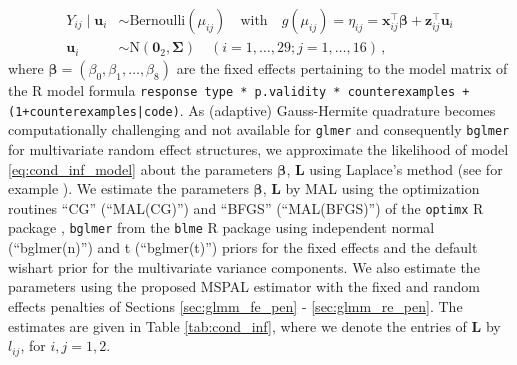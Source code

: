 \documentclass[11pt, a4paper]{article}
\newcommand*{\bb}{\boldsymbol}
\theoremstyle{example} \newtheorem{example}{Example}[section]
\theoremstyle{theorem} \newtheorem{theorem}{Theorem}[section]
\def\bbeta{\bb{\beta}}
\def\bu{\bb{u}}
\def\bx{\bb{x}}
\def\bz{\bb{z}}
\def\b0{\bb{0}}
\def\bL{\bb{L}}
\begin{document}
\begin{align}
\label{eq:cond_inf_model} 
  Y_{ij} \mid \bb{u}_i & \sim \text{Bernoulli}(\mu_{ij}) \quad \text{with} \quad
g(\mu_{ij}) = \eta_{ij} = \bx_{ij}^\top \bbeta + \bz_{ij}^\top \bu_i\\
\bu_i & \sim \text{N}(\b0_2, \bb{\Sigma})  \quad (i = 1, \ldots, 29; j = 1, \ldots, 16)\,,
\end{align}
where $\bbeta = (\beta_0,\beta_1,\ldots,\beta_8)$ are the fixed effects pertaining to the model matrix of the R model formula \texttt{response \raisebox{-0.9ex}{\~{}} type * p.validity * counterexamples + (1+counterexamples|code)}. As (adaptive) Gauss-Hermite quadrature becomes computationally challenging and not available for \texttt{glmer} and consequently \texttt{bglmer} for multivariate random effect structures, we approximate the likelihood of model \eqref{eq:cond_inf_model} about the parameters $\bbeta$, $\bL$ using Laplace's method (see for example \cite{pinheiro1995approximations}). We estimate the parameters $\bbeta$, $\bL$ by MAL using the optimization routines ``CG'' (``MAL(CG)'') and ``BFGS'' (``MAL(BFGS)'') of the \texttt{optimx} R package \citep{nash+varadhan:2011}, \texttt{bglmer} from the \texttt{blme} R package \cite{chung+etal:2015} using independent normal (``bglmer(n)'') and t (``bglmer(t)'') priors for the fixed effects and the default wishart prior for the multivariate variance components. We also estimate the parameters using the proposed MSPAL estimator with the fixed and random effects penalties of Sections \ref{sec:glmm_fe_pen} - \ref{sec:glmm_re_pen}. The estimates are given in Table \ref{tab:cond_inf}, where we denote the entries of $\bL$ by $l_{ij}$, for $i,j=1,2$. 
\end{document}
